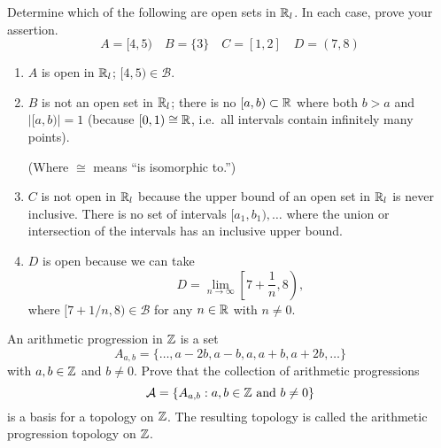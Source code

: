 \documentclass[twocolumn, noxcolor, maketitle]{rbt-mathnotes-hw}
\def\basis{\mathcal{B}}
\begin{document}
\begin{problem}[1.12]
  Determine which of the following are open sets in $\mathbb{R}_l$. In each case, prove
  your assertion.
  \[ A = [4,5)
    \quad B = \{3\}
    \quad C = [1,2]
    \quad D = (7,8) \]
\end{problem}
\begin{enumerate}
  \item $A$ is open in $\mathbb{R}_l$; $[4,5) \in \basis$.
  \item $B$ is not an open set in $\mathbb{R}_l$; there is no $[a, b) \subset \mathbb{R}$ where
    both $b > a$ and $|[a, b)| = 1$ (because $[0,1) \cong \mathbb{R}$, i.e.~all
    intervals contain infinitely many points).

    (Where $\cong$ means ``is isomorphic to.'')
  \item $C$ is not open in $\mathbb{R}_l$ because the upper bound of an open set in
    $\mathbb{R}_l$ is never inclusive. There is no set of intervals $[a_1, b_1), \dots$
    where the union or intersection of the intervals has an inclusive upper bound.
  \item $D$ is open because we can take
    \[ D = \lim_{n\to\infty} \left[7 + \frac{1}{n}, 8\right), \]
    where $[7 + 1/n, 8) \in \basis$ for any $n \in \mathbb{R}$ with $n \ne 0$.
\end{enumerate}

\pagebreak
\begin{problem}[1.15]
  An arithmetic progression in $\mathbb{Z}$ is a set
  \[ A_{a,b} = \{\dots, a - 2b, a - b, a, a + b, a + 2b, \dots\} \]
  with $a,b \in \mathbb{Z}$ and $b \ne 0$. Prove that the collection of arithmetic
  progressions
  \[ \mathcal{A} = \{ A_{a,b} : a, b \in \mathbb{Z} \text{ and } b \ne 0 \} \]
  is a basis for a topology on $\mathbb{Z}$. The resulting topology is called the
  arithmetic progression topology on $\mathbb{Z}$.
\end{problem}
\end{document}

